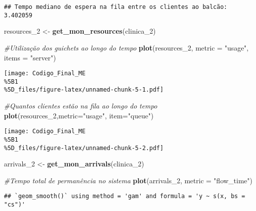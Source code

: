 \documentclass[
]{article}
\newenvironment{Shaded}{\begin{snugshade}}{\end{snugshade}}
\newcommand{\AttributeTok}[1]{\textcolor[rgb]{0.13,0.29,0.53}{#1}}
\newcommand{\CommentTok}[1]{\textcolor[rgb]{0.56,0.35,0.01}{\textit{#1}}}
\newcommand{\FunctionTok}[1]{\textcolor[rgb]{0.13,0.29,0.53}{\textbf{#1}}}
\newcommand{\NormalTok}[1]{#1}
\newcommand{\OtherTok}[1]{\textcolor[rgb]{0.56,0.35,0.01}{#1}}
\newcommand{\StringTok}[1]{\textcolor[rgb]{0.31,0.60,0.02}{#1}}
\begin{document}
\begin{verbatim}
## Tempo mediano de espera na fila entre os clientes ao balcão:  3.402059
\end{verbatim}

\begin{Shaded}
\begin{Highlighting}[]
\NormalTok{resources\_2 }\OtherTok{\textless{}{-}} \FunctionTok{get\_mon\_resources}\NormalTok{(clinica\_2)}

\CommentTok{\#Utilização dos guichets ao longo do tempo}
\FunctionTok{plot}\NormalTok{(resources\_2, }\AttributeTok{metric =} \StringTok{"usage"}\NormalTok{, }\AttributeTok{items =} \StringTok{"server"}\NormalTok{)}
\end{Highlighting}
\end{Shaded}

\texttt{[image: Codigo\_Final\_ME\\\%5B1\\\%5D\_files/figure-latex/unnamed-chunk-5-1.pdf]}

\begin{Shaded}
\begin{Highlighting}[]
\CommentTok{\#Quantos clientes estão na fila ao longo do tempo}
\FunctionTok{plot}\NormalTok{(resources\_2,}\AttributeTok{metric=}\StringTok{"usage"}\NormalTok{, }\AttributeTok{item=}\StringTok{"queue"}\NormalTok{) }
\end{Highlighting}
\end{Shaded}

\texttt{[image: Codigo\_Final\_ME\\\%5B1\\\%5D\_files/figure-latex/unnamed-chunk-5-2.pdf]}

\begin{Shaded}
\begin{Highlighting}[]
\NormalTok{arrivals\_2 }\OtherTok{\textless{}{-}} \FunctionTok{get\_mon\_arrivals}\NormalTok{(clinica\_2)}

\CommentTok{\#Tempo total de permanência no sistema}
\FunctionTok{plot}\NormalTok{(arrivals\_2, }\AttributeTok{metric =} \StringTok{"flow\_time"}\NormalTok{)   }
\end{Highlighting}
\end{Shaded}

\begin{verbatim}
## `geom_smooth()` using method = 'gam' and formula = 'y ~ s(x, bs = "cs")'
\end{verbatim}
\end{document}
